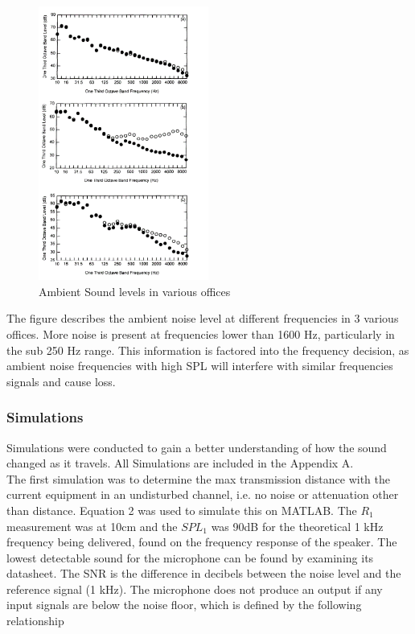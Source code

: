 \begin{figure}[H]
\centering
\noindent\includegraphics[width=5.57cm,height=9.0cm]{./images/noise.png}
\caption{Ambient Sound levels in various offices \cite{noiseRep}}
\label{fig:noise}
\end{figure}

The figure describes the ambient noise level at different frequencies in 3 various offices. More noise is present at frequencies lower than 1600 Hz, particularly in the sub 250 Hz range. This information is factored into the frequency decision, as ambient noise frequencies with high SPL will interfere with similar frequencies signals and cause loss. 

\subsubsection{Simulations}

Simulations were conducted to gain a better understanding of how the sound changed as it travels. All Simulations are included in the Appendix A. \\

The first simulation was to determine the max transmission distance with the current equipment in an undisturbed channel, i.e. no noise or attenuation other than distance. Equation 2 was used to simulate this on MATLAB. The \( R_{1}\) measurement was at 10cm and the \( SPL_{1}\) was 90dB for the theoretical 1 kHz frequency being delivered, found on the frequency response of the speaker. The lowest detectable sound for the microphone can be found by examining its datasheet. The SNR is the difference in decibels between the noise level and the reference signal (1 kHz). The microphone does not produce an output if any input signals are below the noise floor, which is defined by the following relationship 

